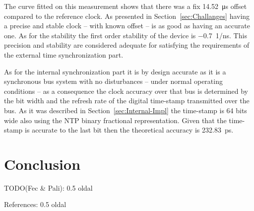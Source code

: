 \documentclass[article]{IEEEtran}
\begin{document}
The curve fitted on this measurement shows that there was a fix \SI{14.52}{\micro\second} offset compared to the
reference clock. As presented in Section~\ref{sec:Challanges}
having a precise and stable clock -- with known offset -- is as good as having an accurate one. As for the stability
the first order stability of the
device is \SI{-0.7}{1/\nano\second}. This precision and stability are considered adequate for satisfying the
requirements of the external time synchronization part.

As for the internal synchronization part it is by design accurate as it is a synchronous bus system with no
disturbances -- under normal operating conditions -- as a
consequence the clock accuracy over that bus is determined by the bit width and the refresh rate of the digital
time-stamp transmitted over the bus. As it was described in Section~\ref{sec:Internal-Impl} the
time-stamp is 64 bits wide also using the NTP binary fractional representation. Given that the time-stamp is accurate
to the last bit then the theoretical accuracy is \SI{232.83}{\pico\second}.

\section{Conclusion}

TODO(Fec \& Pali): 0.5 oldal

References: 0.5 oldal





%

%
%
\end{document}
